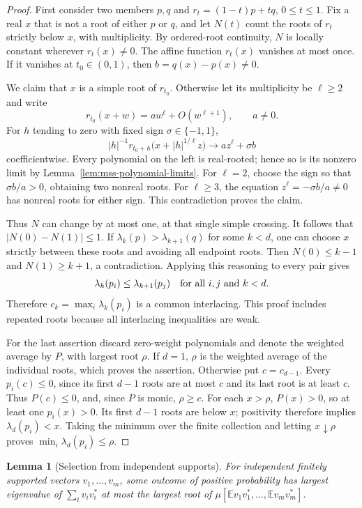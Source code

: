 \documentclass[11pt]{amsart}
\newtheorem{lemma}[theorem]{Lemma}
\theoremstyle{definition}
\theoremstyle{remark}
\numberwithin{equation}{section}
\begin{document}
\begin{proof}
First consider two members $p,q$ and
$r_t=(1-t)p+tq$, $0\leq t\leq1$.
Fix a real $x$ that is not a root of either $p$ or $q$, and let $N(t)$
count the roots of $r_t$ strictly below $x$, with multiplicity.
By ordered-root continuity, $N$ is locally constant wherever
$r_t(x)\ne0$.  The affine function $r_t(x)$ vanishes at most once.
If it vanishes at $t_0\in(0,1)$, then
$b=q(x)-p(x)\ne0$.

We claim that $x$ is a simple root of $r_{t_0}$.  Otherwise let its
multiplicity be $\ell\geq2$ and write
\[
 r_{t_0}(x+w)=aw^\ell+O(w^{\ell+1}),\qquad a\ne0.
\]
For $h$ tending to zero with fixed sign $\sigma\in\{-1,1\}$,
\[
 |h|^{-1}r_{t_0+h}\bigl(x+|h|^{1/\ell}z\bigr)
 \longrightarrow az^\ell+\sigma b
\]
coefficientwise.  Every polynomial on the left is real-rooted; hence
so is its nonzero limit by Lemma~\ref{lem:mss-polynomial-limits}.
For $\ell=2$, choose the sign so that $\sigma b/a>0$, obtaining
two nonreal roots.  For $\ell\geq3$, the equation
$z^\ell=-\sigma b/a\ne0$ has nonreal roots for either sign.
This contradiction proves the claim.

Thus $N$ can change by at most one, at that single simple crossing.
It follows that $|N(0)-N(1)|\leq1$.
If $\lambda_k(p)>\lambda_{k+1}(q)$ for some $k<d$, one can choose
$x$ strictly between these roots and avoiding all endpoint roots.
Then $N(0)\leq k-1$ and $N(1)\geq k+1$, a contradiction.
Applying this reasoning to every pair gives
\[
 \lambda_k(p_i)\leq\lambda_{k+1}(p_j)
 \quad\hbox{for all }i,j\hbox{ and }k<d.
\]
Therefore $c_k=\max_i\lambda_k(p_i)$ is a common interlacing.
This proof includes repeated roots because all interlacing
inequalities are weak.

For the last assertion discard zero-weight polynomials and denote
the weighted average by $P$, with largest root $\rho$.
If $d=1$, $\rho$ is the weighted average of the individual roots,
which proves the assertion.  Otherwise put $c=c_{d-1}$.
Every $p_i(c)\leq0$, since its first $d-1$ roots are at most $c$
and its last root is at least $c$.  Thus $P(c)\leq0$, and, since
$P$ is monic, $\rho\geq c$.
For each $x>\rho$, $P(x)>0$, so at least one $p_i(x)>0$.
Its first $d-1$ roots are below $x$; positivity therefore implies
$\lambda_d(p_i)<x$.  Taking the minimum over the finite collection
and letting $x\downarrow\rho$ proves
$\min_i\lambda_d(p_i)\leq\rho$.
\end{proof}

\begin{lemma}[Selection from independent supports]
\label{lem:mss-selection}
For independent finitely supported vectors $v_1,\ldots,v_m$, some
outcome of positive probability has largest eigenvalue of
$\sum_i v_iv_i^*$ at most the largest root of
$\mu[\mathbb E v_1v_1^*,\ldots,\mathbb E v_mv_m^*]$.
\end{lemma}
\end{document}
